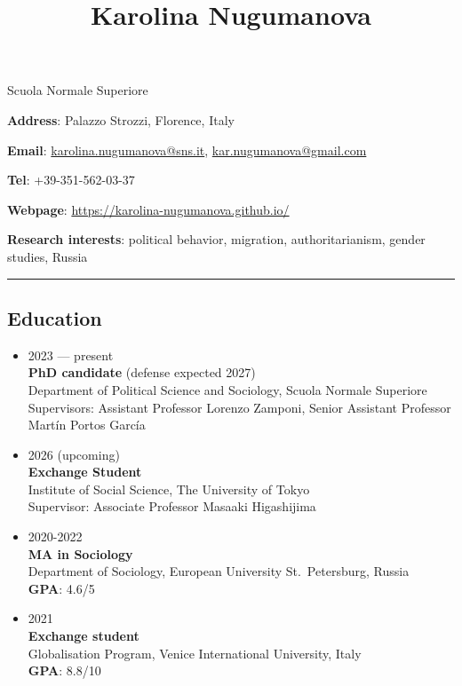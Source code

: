 \documentclass[
]{article}
\title{Karolina Nugumanova}
\author{}
\date{\vspace{-2.5em}}
\begin{document}
\maketitle

\centerline{Scuola Normale Superiore} \centerline{\textbf{Address}: Palazzo Strozzi, Florence, Italy} \centerline{\textbf{Email}: \href{mailto:karolina.nugumanova@sns.it}{karolina.nugumanova@sns.it}, \href{mailto:kar.nugumanova@gmail.com}{kar.nugumanova@gmail.com}} \centerline{\textbf{Tel}: +39-351-562-03-37} \centerline{\textbf{Webpage}: \url{https://karolina-nugumanova.github.io/}}

\textbf{Research interests}: political behavior, migration,
authoritarianism, gender studies, Russia

\vspace{1mm} \hrule

\hypertarget{education}{%
\subsection{Education}\label{education}}

\begin{itemize}
\item
  2023 --- present\\
  \textbf{PhD candidate} (defense expected 2027)\\
  Department of Political Science and Sociology, Scuola Normale
  Superiore\\
  Supervisors: Assistant Professor Lorenzo Zamponi, Senior Assistant
  Professor Martín Portos García
\item
  2026 (upcoming)\\
  \textbf{Exchange Student}\\
  Institute of Social Science, The University of Tokyo\\
  Supervisor: Associate Professor Masaaki Higashijima
\item
  2020-2022\\
  \textbf{MA in Sociology}\\
  Department of Sociology, European University St.~Petersburg, Russia\\
  \textbf{GPA}: 4.6/5
\item
  2021\\
  \textbf{Exchange student}\\
  Globalisation Program, Venice International University, Italy\\
  \textbf{GPA}: 8.8/10
\end{itemize}
\end{document}
